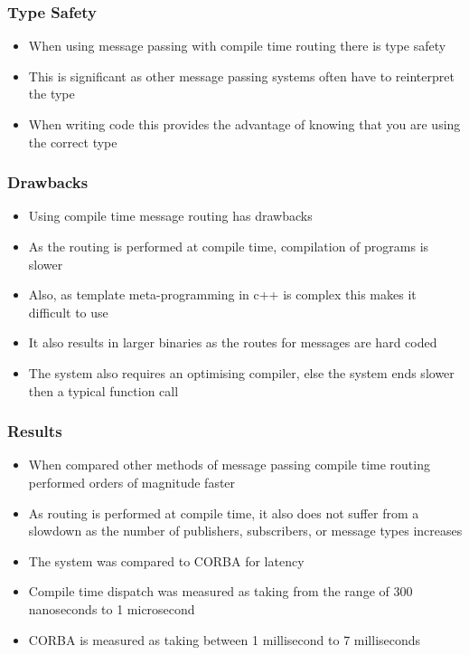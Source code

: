 \documentclass{beamer}
\begin{document}
	\begin{frame}
		\frametitle{Type Safety}
		\begin{itemize}
			\item When using message passing with compile time routing there is type safety
			\item This is significant as other message passing systems often have to reinterpret the type
			\item When writing code this provides the advantage of knowing that you are using the correct type
		\end{itemize}
	\end{frame}
	
	\begin{frame}
		\frametitle{Drawbacks}
		\begin{itemize}
			\item Using compile time message routing has drawbacks
			\item As the routing is performed at compile time, compilation of programs is slower
			\item Also, as template meta-programming in c++ is complex this makes it difficult to use
			\item It also results in larger binaries as the routes for messages are hard coded
			\item The system also requires an optimising compiler, else the system ends slower then a typical function call
		\end{itemize}
	\end{frame}
	
	\begin{frame}
		\frametitle{Results}
		\begin{itemize}
			\item When compared other methods of message passing compile time routing performed orders of magnitude faster
			\item As routing is performed at compile time, it also does not suffer from a slowdown as the number of publishers, subscribers, or message types increases
			\item The system was compared to CORBA for latency
			\item Compile time dispatch was measured as taking from the range of 300 nanoseconds to 1 microsecond
			\item CORBA is measured as taking between 1 millisecond to 7 milliseconds
		\end{itemize}
	\end{frame}
	
\end{document}
